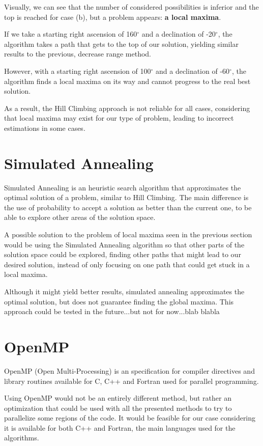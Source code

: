Visually, we can see that the number of considered possibilities is inferior and the top is reached for case (b), but a problem appears: \textbf{a local maxima}.

If we take a starting right ascension of 160$^{\circ}$ and a declination of -20$^{\circ}$, the algorithm takes a path that gets to the top of our solution, yielding similar results to the previous, decrease range method.

However, with a starting right ascension of 100$^{\circ}$ and a declination of -60$^{\circ}$, the algorithm finds a local maxima on its way and cannot progress to the real best solution.

As a result, the Hill Climbing approach is not reliable for all cases, considering that local maxima may exist for our type of problem, leading to incorrect estimations in some cases.

\section{Simulated Annealing}

Simulated Annealing is an heuristic search algorithm that approximates the optimal solution of a problem, similar to Hill Climbing. The main difference is the use of probability to accept a solution as better than the current one, to be able to explore other areas of the solution space.

A possible solution to the problem of local maxima seen in the previous section would be using the Simulated Annealing algorithm so that other parts of the solution space could be explored, finding other paths that might lead to our desired solution, instead of only focusing on one path that could get stuck in a local maxima.

Although it might yield better results, simulated annealing approximates the optimal solution, but does not guarantee finding the global maxima. This approach could be tested in the future...but not for now...blab blabla

\section{OpenMP}

OpenMP (Open Multi-Processing) is an specification for compiler directives and library routines available for C, C++ and Fortran used for parallel programming.

Using OpenMP would not be an entirely different method, but rather an optimization that could be used with all the presented methods to try to parallelize some regions of the code. It would be feasible for our case considering it is available for both C++ and Fortran, the main languages used for the algorithms.

